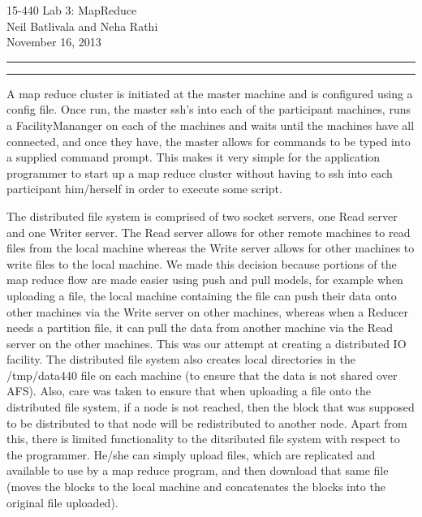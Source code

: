 \documentclass[11pt]{article}
\newcommand{\question}[2] {\vspace{.25in} \hrule\vspace{0.5em}
\noindent{\bf #1: #2} \vspace{0.5em}
\hrule \vspace{.10in}}
\begin{document}
\medskip

\thispagestyle{plain}
\begin{center}
{\Large 15-440 Lab 3: MapReduce} \\
Neil Batlivala and Neha Rathi \\
November 16, 2013 \\
\end{center}

\question{I} {Design}
A map reduce cluster is initiated at the master machine and is configured using a config file. Once run, the master ssh's into each of the participant machines, runs a FacilityMananger on each of the machines and waits until the machines have all connected, and once they have, the master allows for commands to be typed into a supplied command prompt. This makes it very simple for the application programmer to start up a map reduce cluster without having to ssh into each participant him/herself in order to execute some script.

The distributed file system is comprised of two socket servers, one Read server and one Writer server. The Read server allows for other remote machines to read files from the local machine whereas the Write server allows for other machines to write files to the local machine. We made this decision because portions of the map reduce flow are made easier using push and pull models, for example when uploading a file, the local machine containing the file can push their data onto other machines via the Write server on other machines, whereas when a Reducer needs a partition file, it can pull the data from another machine via the Read server on the other machines. This was our attempt at creating a distributed IO facility. The distributed file system also creates local directories in the /tmp/data440 file on each machine (to ensure that the data is not shared over AFS). Also, care was taken to ensure that when uploading a file onto the distributed file system, if a node is not reached, then the block that was supposed to be distributed to that node will be redistributed to another node. Apart from this, there is limited functionality to the ditsributed file system with respect to the programmer. He/she can simply upload files, which are replicated and available to use by a map reduce program, and then download that same file (moves the blocks to the local machine and concatenates the blocks into the original file uploaded).
\end{document}
